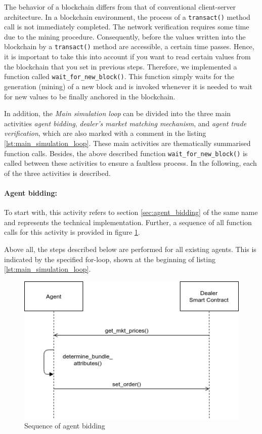 The behavior of a blockchain differs from that of conventional client-server architecture.
In a blockchain environment, the process of a \verb|transact()| method call is not immediately completed.
The network verification requires some time due to the mining procedure. 
Consequently, before the values written into the blockchain by a \verb|transact()| method are accessible, a certain time passes.
Hence, it is important to take this into account if you want to read certain values 
from the blockchain that you set in previous steps. 
Therefore, we implemented a function called \verb|wait_for_new_block()|. This function
simply waits for the generation (mining) of a new block and 
is invoked whenever it is needed to wait for new values to be finally anchored in the blockchain.

In addition, the \textit{Main simulation loop} can be divided into the three main activities 
\textit{agent bidding}, \textit{dealer's market matching mechanism}, and \textit{agent trade verification},
which are also marked with a comment in the listing \ref{lst:main_simulation_loop}.
These main activities are thematically summarised function calls.
Besides, the above described function \verb|wait_for_new_block()| is called between these activities
to ensure a faultless process. 
In the following, each of the three activities is described.

\paragraph{Agent bidding:}
To start with, this activity refers to section \ref{sec:agent_bidding} of the same name and represents
the technical implementation. Further, a sequence of all function 
calls for this activity is provided in figure \ref{figure:agent_bidding_figure}.

Above all, the steps described below are performed for all existing agents. 
This is indicated by the specified for-loop, shown at the beginning of listing \ref{lst:main_simulation_loop}.

\begin{figure}[htbp]
	\centering
	\includegraphics[width=.8\linewidth]{./figures/agent_bidding.png}
	\caption{Sequence of agent bidding}
	\label{figure:agent_bidding_figure}
\end{figure}

